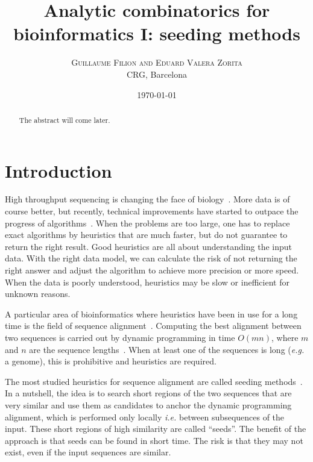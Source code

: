 \documentclass{article}
\title{Analytic combinatorics for bioinformatics I:
seeding methods}
\author{
\textsc{Guillaume Filion and Eduard Valera Zorita} \\ [1ex]
\normalsize CRG, Barcelona
}
\date{\today}
\begin{document}
\maketitle

\begin{abstract}
The abstract will come later.
\end{abstract}



\section{Introduction}

High throughput sequencing is changing the face of
biology~\cite{pmid26000844, pmid27184599}. More data is of course better,
but recently, technical improvements have started to outpace the progress
of algorithms~\cite{Quilez136358}. When the problems are too large, one
has to replace exact algorithms by heuristics that are much faster, but do
not guarantee to return the right result. Good heuristics are all about
understanding the input data. With the right data model, we can calculate
the risk of not returning the right answer and adjust the algorithm to
achieve more precision or more speed. When the data is poorly understood,
heuristics may be slow or inefficient for unknown reasons.

A particular area of bioinformatics where heuristics have been in use for
a long time is the field of sequence alignment~\cite{pmid20460430}.
Computing the best alignment between two sequences is carried out by
dynamic programming in time $O(mn)$, where $m$ and $n$ are the sequence
lengths~\cite{durbin1998biological}. When at least one of the sequences is
long (\textit{e.g.} a genome), this is prohibitive and heuristics are
required.

The most studied heuristics for sequence alignment are called seeding
methods~\cite{pmid16533404}. In a nutshell, the idea is to search short
regions of the two sequences that are very similar and use them as
candidates to anchor the dynamic programming alignment, which is performed
only locally \textit{i.e.} between subsequences of the input. These short
regions of high similarity are called ``seeds''. The benefit of the
approach is that seeds can be found in short time. The risk is that they
may not exist, even if the input sequences are similar.
\end{document}
